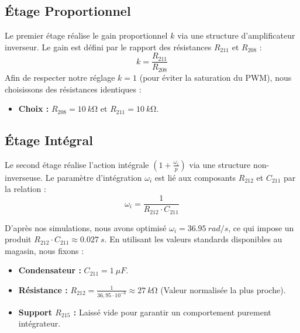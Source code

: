 \documentclass[11pt]{report}
\begin{document}
\subsection{Étage Proportionnel}
Le premier étage réalise le gain proportionnel $k$ via une structure d'amplificateur inverseur. Le gain est défini par le rapport des résistances $R_{211}$ et $R_{208}$ :
\begin{equation*}
    k = \frac{R_{211}}{R_{208}}
\end{equation*}
Afin de respecter notre réglage $k=1$ (pour éviter la saturation du PWM), nous choisissons des résistances identiques :
\begin{itemize}
    \item \textbf{Choix :} $R_{208} = \qty{10}{k\ohm}$ et $R_{211} = \qty{10}{k\ohm}$.
\end{itemize}

\subsection{Étage Intégral}
Le second étage réalise l'action intégrale $(1 + \frac{\omega_i}{p})$ via une structure non-inverseuse. Le paramètre d'intégration $\omega_i$ est lié aux composants $R_{212}$ et $C_{211}$ par la relation :
\begin{equation*}
    \omega_i = \frac{1}{R_{212} \cdot C_{211}}
\end{equation*}

D'après nos simulations, nous avons optimisé $\omega_i = \qty{36,95}{rad/s}$, ce qui impose un produit $R_{212} \cdot C_{211} \approx \qty{0,027}{s}$. En utilisant les valeurs standards disponibles au magasin, nous fixons :
\begin{itemize}
    \item \textbf{Condensateur :} $C_{211} = \qty{1}{\mu F}$.
    \item \textbf{Résistance :} $R_{212} = \frac{1}{36,95 \cdot 10^{-6}} \approx \qty{27}{k\ohm}$ (Valeur normalisée la plus proche).
    \item \textbf{Support $R_{215}$ :} Laissé vide pour garantir un comportement purement intégrateur.
\end{itemize}
\end{document}

